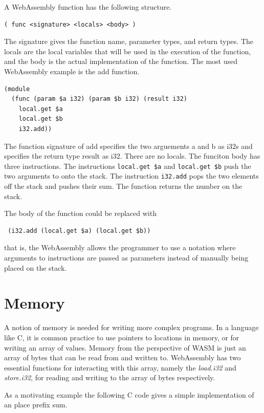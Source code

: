 \documentclass[11pt]{book}
\begin{document}
A WebAssembly function has the following structure.
\begin{verbatim}
( func <signature> <locals> <body> )
\end{verbatim}
The signature gives the function name, parameter types, and return types. The locals are the local variables that will be used in the execution of the function, and the body is the actual implementation of the function. The most used WebAssembly example is the add function. 

\begin{verbatim}
(module
  (func (param $a i32) (param $b i32) (result i32)
    local.get $a
    local.get $b
    i32.add))
\end{verbatim}

The function signature of add specifies the two arguements a and b as i32s and specifies the return type result as i32. There are no locals. The funciton body has three instructions. The instructions \texttt{local.get \$a} and \texttt{local.get \$b} push the two arguments to onto the stack. The instruction \texttt{i32.add} pops the two elements off the stack and pushes their sum. The function returns the number on the stack. 

The body of the function could be replaced with 
\begin{verbatim}
 (i32.add (local.get $a) (local.get $b))
\end{verbatim}
that is, the WebAssembly allows the programmer to use a notation where arguments to instructions are passed as parameters instead of manually being placed on the stack.



\section{Memory}

A notion of memory is needed for writing more complex programs. In a language like C, it is common practice to use pointers to locations in memory, or for writing an array of values. Memory from the perspective of WASM is just an array of bytes that can be read from and written to. WebAssembly has two essential functions for interacting with this array, namely the \textit{load.i32} and \textit{store.i32}, for reading and writing to the array of bytes respectively.

As a motivating example the following C code gives a simple implementation of an place prefix sum.
\end{document}
